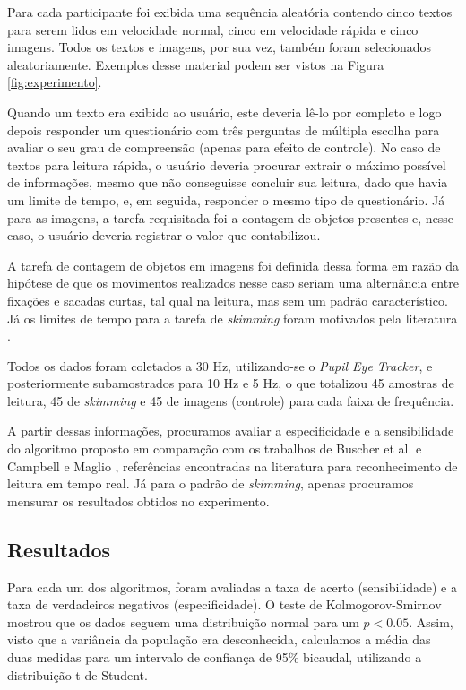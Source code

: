 \documentclass[12pt]{article}
\begin{document}
		Para cada participante foi exibida uma sequência aleatória contendo cinco textos para serem lidos em velocidade normal, cinco em velocidade rápida e cinco imagens. Todos os textos e imagens, por sua vez, também foram selecionados aleatoriamente. Exemplos desse material podem ser vistos na Figura \ref{fig:experimento}.
		
		Quando um texto era exibido ao usuário, este deveria lê-lo por completo e logo depois responder um questionário com três perguntas de múltipla escolha para avaliar o seu grau de compreensão (apenas para efeito de controle). No caso de textos para leitura rápida, o usuário deveria procurar extrair o máximo possível de informações, mesmo que não conseguisse concluir sua leitura, dado que havia um limite de tempo, e, em seguida, responder o mesmo tipo de questionário. Já para as imagens, a tarefa requisitada foi a contagem de objetos presentes e, nesse caso, o usuário deveria registrar o valor que contabilizou. 
		
		A tarefa de contagem de objetos em imagens foi definida dessa forma em razão da hipótese de que os movimentos realizados nesse caso seriam uma alternância entre fixações e sacadas curtas, tal qual na leitura, mas sem um padrão característico. Já os limites de tempo para a tarefa de \textit{skimming} foram motivados pela literatura \cite{Dyson-2001}.
		
		Todos os dados foram coletados a 30 Hz, utilizando-se o \textit{Pupil Eye Tracker}, e posteriormente subamostrados para 10 Hz e 5 Hz, o que totalizou 45 amostras de leitura, 45 de \textit{skimming} e 45 de imagens (controle) para cada faixa de frequência. 
		
		A partir dessas informações, procuramos avaliar a especificidade e a sensibilidade do algoritmo proposto em comparação com os trabalhos de Buscher et al. \cite{Buscher-2008} e Campbell e Maglio \cite{Campbell-2001}, referências encontradas na literatura para reconhecimento de leitura em tempo real. Já para o padrão de \textit{skimming}, apenas procuramos mensurar os resultados obtidos no experimento.
		
		\subsection{Resultados}
		Para cada um dos algoritmos, foram avaliadas a taxa de acerto (sensibilidade) e a taxa de verdadeiros negativos (especificidade). O teste de Kolmogorov-Smirnov mostrou que os dados seguem uma distribuição normal para um $p < 0.05$. Assim, visto que a variância da população era desconhecida, calculamos a média das duas medidas para um intervalo de confiança de 95\% bicaudal, utilizando a distribuição t de Student.
		
\end{document}
